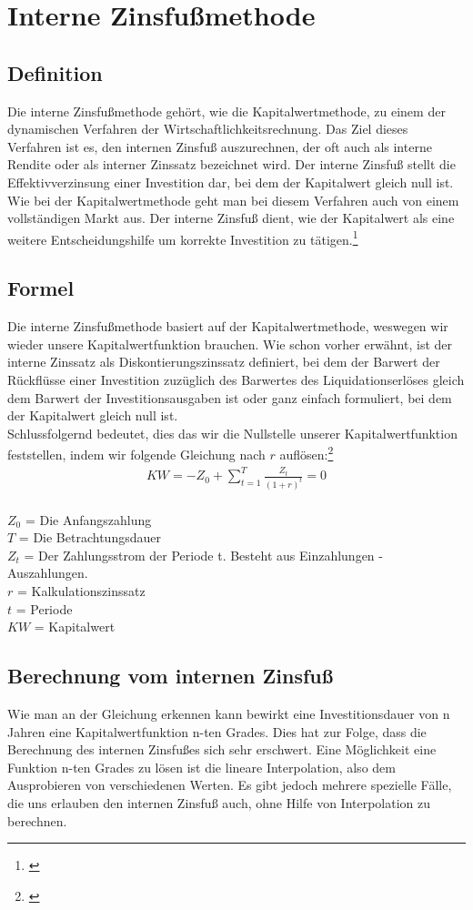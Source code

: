 \chapter{Interne Zinsfußmethode}
\label{Interne Zinsfussmethode}
\section{Definition}
Die interne Zinsfußmethode gehört, wie die Kapitalwertmethode, zu einem der dynamischen Verfahren der Wirtschaftlichkeitsrechnung. Das Ziel dieses Verfahren ist es, den internen Zinsfuß auszurechnen, der oft auch als interne Rendite oder als interner Zinssatz bezeichnet wird. Der interne Zinsfuß stellt die Effektivverzinsung einer Investition dar, bei dem der Kapitalwert gleich null ist. Wie bei der Kapitalwertmethode geht man bei diesem Verfahren auch von einem vollständigen Markt aus. Der interne Zinsfuß dient, wie der Kapitalwert als eine weitere Entscheidungshilfe um korrekte Investition zu tätigen.\footnote{\cite{studyflix-interner-zinsfuss}}
\section{Formel}
Die interne Zinsfußmethode basiert auf der Kapitalwertmethode, weswegen wir wieder unsere Kapitalwertfunktion brauchen. Wie schon vorher erwähnt, ist der interne Zinssatz als Diskontierungszinssatz
definiert, bei dem der Barwert der Rückflüsse einer Investition zuzüglich des Barwertes des Liquidationserlöses gleich dem Barwert der Investitionsausgaben ist oder ganz einfach formuliert, bei dem der Kapitalwert gleich null ist.\\
Schlussfolgernd bedeutet, dies das wir die Nullstelle unserer Kapitalwertfunktion feststellen, indem wir folgende Gleichung nach $r$ auflösen:\footnote{\cite{lex-interner-zinsfuss}}\newpage
\begin{align*}
    KW = -Z_{0} + \sum \limits_{t=1}^{T}{\frac{Z_{t}}{(1+r)^{t}}} = 0
\end{align*}
\\
$Z_0$ = Die Anfangszahlung \\
$T$  = Die Betrachtungsdauer\\
$Z_t$ = Der Zahlungsstrom der Periode t. Besteht aus Einzahlungen - Auszahlungen.\\
$r$ = Kalkulationszinssatz\\
$t$ = Periode\\
$KW$ = Kapitalwert
\section{Berechnung vom internen Zinsfuß}
Wie man an der Gleichung erkennen kann bewirkt eine Investitionsdauer von n Jahren eine Kapitalwertfunktion n-ten Grades. Dies hat zur Folge, dass die Berechnung des internen Zinsfußes sich sehr erschwert. Eine Möglichkeit eine Funktion n-ten Grades zu lösen ist die lineare Interpolation, also dem Ausprobieren von verschiedenen Werten. Es gibt jedoch mehrere spezielle Fälle, die uns erlauben den internen Zinsfuß auch, ohne Hilfe von Interpolation zu berechnen.
